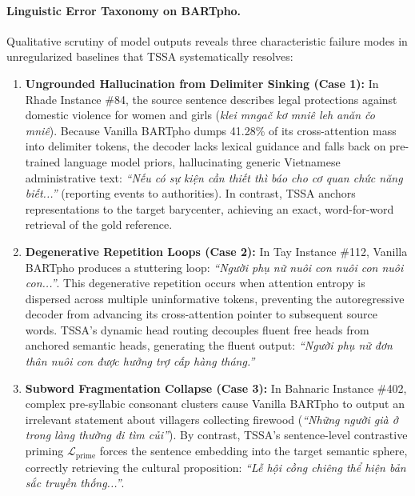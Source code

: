 \documentclass[11pt]{article}
\begin{document}
\paragraph{Linguistic Error Taxonomy on BARTpho.}
Qualitative scrutiny of model outputs reveals three characteristic failure modes in unregularized baselines that TSSA systematically resolves:
\begin{enumerate}[leftmargin=*]
    \item \textbf{Ungrounded Hallucination from Delimiter Sinking (Case 1):} In Rhade Instance \#84, the source sentence describes legal protections against domestic violence for women and girls (\textit{klei mnga\v{c} kơ mni\^e leh anăn \v{c}o mni\^e}). Because Vanilla BARTpho dumps 41.28\% of its cross-attention mass into delimiter tokens, the decoder lacks lexical guidance and falls back on pre-trained language model priors, hallucinating generic Vietnamese administrative text: \textit{``Nếu có sự kiện cần thiết thì báo cho cơ quan chức năng biết...''} (reporting events to authorities). In contrast, TSSA anchors representations to the target barycenter, achieving an exact, word-for-word retrieval of the gold reference.
    \item \textbf{Degenerative Repetition Loops (Case 2):} In Tay Instance \#112, Vanilla BARTpho produces a stuttering loop: \textit{``Người phụ nữ nuôi con nuôi con nuôi con...''}. This degenerative repetition occurs when attention entropy is dispersed across multiple uninformative tokens, preventing the autoregressive decoder from advancing its cross-attention pointer to subsequent source words. TSSA's dynamic head routing decouples fluent free heads from anchored semantic heads, generating the fluent output: \textit{``Người phụ nữ đơn thân nuôi con được hưởng trợ cấp hàng tháng.''}
    \item \textbf{Subword Fragmentation Collapse (Case 3):} In Bahnaric Instance \#402, complex pre-syllabic consonant clusters cause Vanilla BARTpho to output an irrelevant statement about villagers collecting firewood (\textit{``Những người già ở trong làng thường đi tìm củi''}). By contrast, TSSA's sentence-level contrastive priming $\mathcal{L}_{\text{prime}}$ forces the sentence embedding into the target semantic sphere, correctly retrieving the cultural proposition: \textit{``Lễ hội cồng chiêng thể hiện bản sắc truyền thống...''}.
\end{enumerate}
\end{document}
